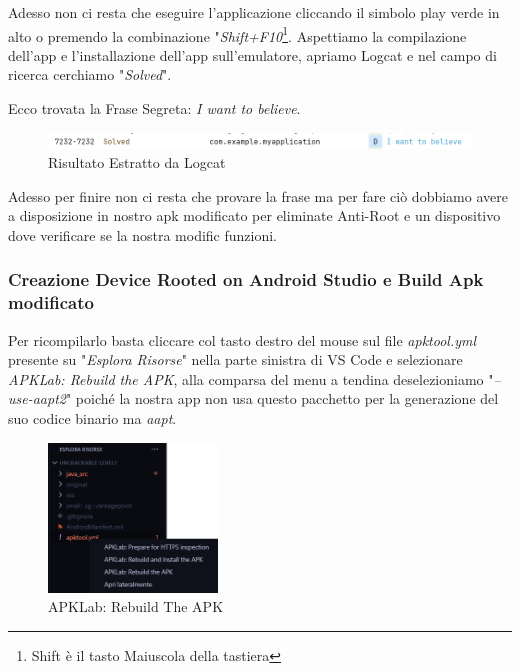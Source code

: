 \documentclass{article}
\begin{document}
Adesso non ci resta che eseguire l'applicazione cliccando il simbolo play verde in alto o premendo la combinazione "\textit{Shift+F10}\footnote{Shift è il tasto Maiuscola della tastiera}.
Aspettiamo la compilazione dell'app e l'installazione dell'app sull'emulatore, apriamo Logcat e nel campo di ricerca cerchiamo "\textit{Solved}".

Ecco trovata la Frase Segreta: \emph{I want to believe}.
\begin{figure}[htbp]
    \centering
    \includegraphics[width=1\textwidth]{./uncrackable1/soluzione.png}
    \captionsetup{labelformat=empty}
    \caption{Risultato Estratto da Logcat}
    \label{fig:logSol}
\end{figure}

Adesso per finire non ci resta che provare la frase ma per fare ciò dobbiamo avere a disposizione in nostro apk modificato per eliminate Anti-Root e 
un dispositivo dove verificare se la nostra modific funzioni.


\subsubsection{Creazione Device Rooted on Android Studio e Build Apk modificato}
Per ricompilarlo basta cliccare col tasto destro del mouse sul file \textit{apktool.yml} presente su "\textit{Esplora Risorse}" nella parte 
sinistra di VS Code e selezionare \textit{APKLab: Rebuild the APK}, alla comparsa del menu a tendina deselezioniamo "\textit{--use-aapt2}" poiché la nostra 
app non usa questo pacchetto per la generazione del suo codice binario ma \textit{aapt}.
\begin{figure}[htbp]
    \centering
    \includegraphics[width=0.4\textwidth]{./uncrackable1/rebuild.png}
    \captionsetup{labelformat=empty}
    \caption{APKLab: Rebuild The APK}
    \label{fig:rebuildApk}
\end{figure}
\end{document}
